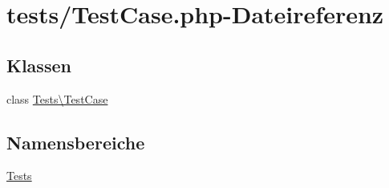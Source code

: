 \hypertarget{TestCase_8php}{}\section{tests/\+Test\+Case.php-\/\+Dateireferenz}
\label{TestCase_8php}
\subsection*{Klassen}
\begin{DoxyCompactItemize}
\item 
class \hyperlink{classTests_1_1TestCase}{Tests\textbackslash{}\+Test\+Case}
\end{DoxyCompactItemize}
\subsection*{Namensbereiche}
\begin{DoxyCompactItemize}
\item 
 \hyperlink{namespaceTests}{Tests}
\end{DoxyCompactItemize}
